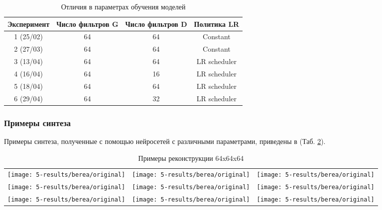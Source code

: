 		\begin{table}[h!]
			\begin{center}
				\begin{tabular}{|c|c|c|c|}
					\hline
					Эксперимент & Число фильтров G & Число фильтров D & Политика LR \\
					\hline
					1 (25/02) & 64 & 64 & Constant \\
					\hline
					2 (27/03) & 64 & 64 & Constant \\
					\hline
					3 (13/04) & 64 & 64 & LR scheduler \\
					\hline
					4 (16/04) & 64 & 16 & LR scheduler \\
					\hline
					5 (18/04) & 64 & 64 & LR scheduler \\
					\hline
					6 (29/04) & 64 & 32 & LR scheduler \\
					\hline
				\end{tabular}
				\caption{Отличия в параметрах обучения моделей}
				\label{todo}
			\end{center}
		\end{table}
	
		\subsubsection{Примеры синтеза}
	
			Примеры синтеза, полученные с помощью нейросетей с различными параметрами, приведены в (Таб. \ref{8-dataset1-images}).
			
			\begin{table}[h!]
				\begin{center}
					\begin{tabular}{p{5cm} p{5cm} p{5cm}}
						\toprule
						\texttt{[image: 5-results/berea/original]}
						&
						\texttt{[image: 5-results/berea/original]}
						&
						\texttt{[image: 5-results/berea/original]}
						\\
						\texttt{[image: 5-results/berea/original]}
						&
						\texttt{[image: 5-results/berea/original]}
						&
						\texttt{[image: 5-results/berea/original]}
						\\
						\texttt{[image: 5-results/berea/original]}
						&
						\texttt{[image: 5-results/berea/original]}
						&
						\texttt{[image: 5-results/berea/original]}
						\\
						\hline
					\end{tabular}
					\caption{Примеры реконструкции 64x64x64}
					\label{8-dataset1-images}
				\end{center}
			\end{table}
			
